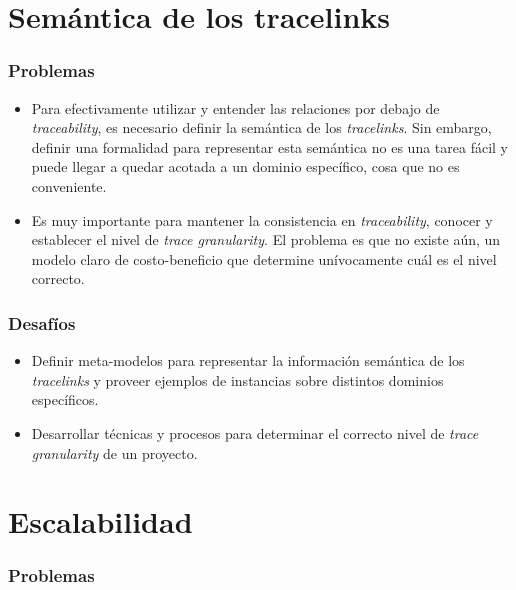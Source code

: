 \documentclass[a4paper,12pt,oneside,spanish]{book}
\begin{document}
\section{Semántica de los tracelinks}
\label{sec:SemanticaTracelinks}

\subsubsection{Problemas}

\begin{itemize}[label={$\times$}]

\item Para efectivamente utilizar y entender las relaciones por debajo de \textit{traceability}, es necesario definir la semántica de los \textit{tracelinks}. Sin embargo, definir una formalidad para representar esta semántica no es una tarea fácil y puede llegar a quedar acotada a un dominio específico, cosa que no es conveniente.

\item Es muy importante para mantener la consistencia en \textit{traceability}, conocer y establecer el nivel de \textit{trace granularity}. El problema es que no existe aún, un modelo claro de costo-beneficio que determine unívocamente cuál es el nivel correcto.

\end{itemize}

\subsubsection{Desafíos}

\begin{itemize}[label={\checkmark}]

\item Definir meta-modelos para representar la información semántica de los \textit{tracelinks} y proveer ejemplos de instancias sobre distintos dominios específicos.

\item Desarrollar técnicas y procesos para determinar el correcto nivel de \textit{trace granularity} de un proyecto.

\end{itemize}

\section{Escalabilidad}

\subsubsection{Problemas}
\end{document}
